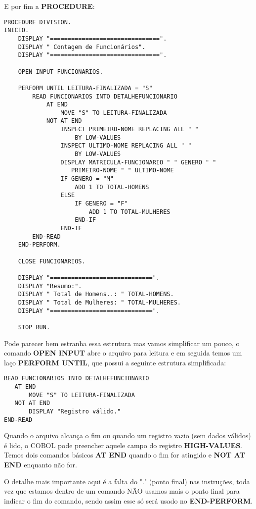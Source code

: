 E por fim a \textbf{PROCEDURE}:
\begin{lstlisting}[]
PROCEDURE DIVISION.
INICIO.
    DISPLAY "===============================".
    DISPLAY " Contagem de Funcionários".
    DISPLAY "===============================".

    OPEN INPUT FUNCIONARIOS.

    PERFORM UNTIL LEITURA-FINALIZADA = "S"
        READ FUNCIONARIOS INTO DETALHEFUNCIONARIO
            AT END
                MOVE "S" TO LEITURA-FINALIZADA
            NOT AT END
                INSPECT PRIMEIRO-NOME REPLACING ALL " " 
                    BY LOW-VALUES
                INSPECT ULTIMO-NOME REPLACING ALL " " 
                    BY LOW-VALUES
                DISPLAY MATRICULA-FUNCIONARIO " " GENERO " "
                   PRIMEIRO-NOME " " ULTIMO-NOME
                IF GENERO = "M"
                    ADD 1 TO TOTAL-HOMENS
                ELSE
                    IF GENERO = "F"
                        ADD 1 TO TOTAL-MULHERES
                    END-IF
                END-IF
        END-READ
    END-PERFORM. 

    CLOSE FUNCIONARIOS.

    DISPLAY "=============================".
    DISPLAY "Resumo:".
    DISPLAY " Total de Homens..: " TOTAL-HOMENS.
    DISPLAY " Total de Mulheres: " TOTAL-MULHERES.
    DISPLAY "=============================".

    STOP RUN.	
\end{lstlisting}

Pode parecer bem estranha essa estrutura mas vamos simplificar um pouco, o comando \textbf{OPEN INPUT} abre o arquivo para leitura e em seguida temos um laço \textbf{PERFORM UNTIL}, que possui a seguinte estrutura simplificada:
\begin{lstlisting}[]
READ FUNCIONARIOS INTO DETALHEFUNCIONARIO
   AT END
       MOVE "S" TO LEITURA-FINALIZADA
   NOT AT END
       DISPLAY "Registro válido."
END-READ
\end{lstlisting}

Quando o arquivo alcança o fim ou quando um registro vazio (sem dados válidos) é lido, o COBOL pode preencher aquele campo do registro \textbf{HIGH-VALUES}. Temos dois comandos básicos \textbf{AT END} quando o fim for atingido e \textbf{NOT AT END} enquanto não for.

O detalhe mais importante aqui é a falta do "." (ponto final) nas instruções, toda vez que estamos dentro de um comando NÃO usamos mais o ponto final para indicar o fim do comando, sendo assim esse só será usado no \textbf{END-PERFORM}.

